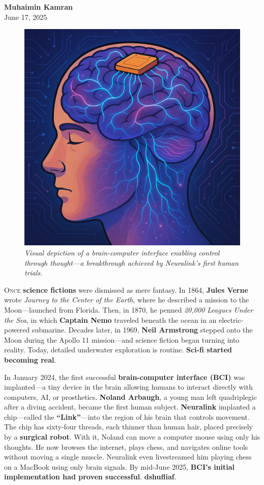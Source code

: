 \documentclass[a4paper,10pt,twocolumn]{memoir}
\newcommand{\article}[3]{
  \section*{#1}
  \addcontentsline{toc}{section}{#1}
  \begin{center}
    \color{dark}\normalsize\textbf{#2}\\
    \small\color{gray}#3
  \end{center}
  \vspace{-0.8em}  %
}
\begin{document}
\article{}{Muhaimin Kamran}{June 17, 2025}
\begin{figure}[h!]
  \centering
  \includegraphics[width=0.9\linewidth]{brainchip.png}
  \caption*{\textit{Visual depiction of a brain-computer interface enabling control through thought—a breakthrough achieved by Neuralink’s first human trials.}}
\end{figure}
\lettrine[lines=3]{O}{nce} \textbf{science fictions} were dismissed as mere fantasy. In 1864, \textbf{Jules Verne} wrote \textit{Journey to the Center of the Earth}, where he described a mission to the Moon—launched from Florida. Then, in 1870, he penned \textit{20,000 Leagues Under the Sea}, in which \textbf{Captain Nemo} traveled beneath the ocean in an electric-powered submarine. Decades later, in 1969, \textbf{Neil Armstrong} stepped onto the Moon during the Apollo 11 mission—and science fiction began turning into reality. Today, detailed underwater exploration is routine. \textbf{Sci-fi started becoming real}.

In January 2024, the first successful \textbf{brain-computer interface (BCI)} was implanted—a tiny device in the brain allowing humans to interact directly with computers, AI, or prosthetics. \textbf{Noland Arbaugh}, a young man left quadriplegic after a diving accident, became the first human subject. \textbf{Neuralink} implanted a chip—called the \textbf{“Link”}—into the region of his brain that controls movement. The chip has sixty-four threads, each thinner than human hair, placed precisely by a \textbf{surgical robot}. With it, Noland can move a computer mouse using only his thoughts. He now browses the internet, plays chess, and navigates online tools without moving a single muscle. Neuralink even livestreamed him playing chess on a MacBook using only brain signals. By mid-June 2025, \textbf{BCI’s initial implementation had proven successful}. \textbf{dshufliaf}. 
\end{document}
